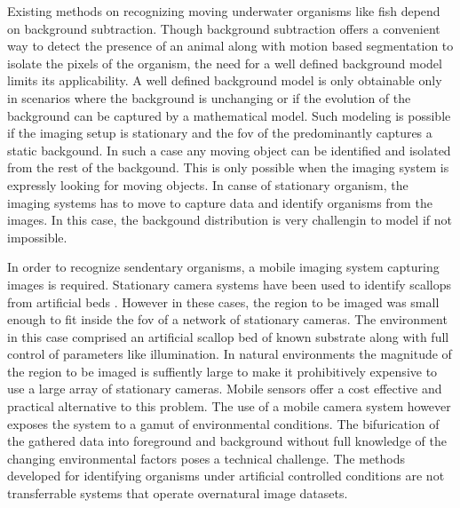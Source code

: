 \documentclass {udthesis}
\begin{document}
Existing methods on recognizing moving underwater organisms like fish depend on background subtraction. Though background subtraction 
offers a convenient way to detect the presence of an animal along with motion based segmentation to isolate the pixels of the organism, the need for a well defined background model limits its applicability. A well defined background model is only obtainable only in scenarios where the background is unchanging or if the evolution of the background can be captured by a mathematical model. Such modeling is possible if the imaging setup is stationary and the \gls{fov} of the predominantly captures a static backgound. In such a case any moving object can be identified and isolated from the rest of the backgound. This is only possible when the imaging system is expressly looking for moving objects. In canse of stationary organism, the imaging systems has to move to capture data and identify organisms from the images. In this case, the backgound distribution is very challengin to model if not impossible.

In order to recognize sendentary organisms, a mobile imaging system capturing images is required. Stationary camera systems have been used to identify scallops from artificial beds \cite{enomoto9, enomoto10}. However in these cases, the region to be imaged was small enough to fit inside the \gls{fov} of a network of stationary cameras. The environment in this case comprised an artificial scallop bed of known substrate along with full control of parameters like illumination. In natural environments the magnitude of the region to be imaged is suffiently large to make it prohibitively expensive to use a large array of stationary cameras. Mobile sensors offer a cost effective and practical alternative to this problem. The use of a mobile camera system however exposes the system to a gamut of environmental conditions. The bifurication of the gathered data into foreground and background without full knowledge of the changing environmental factors poses a technical challenge. The methods developed for identifying 
organisms under artificial controlled conditions are not transferrable systems that operate overnatural image datasets.
\end{document}
